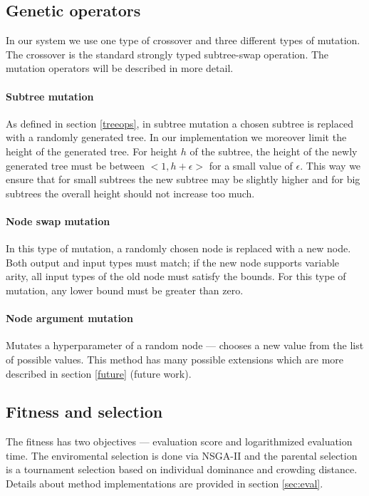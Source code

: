 \subsection{Genetic operators}
In our system we use one type of crossover and three different types of
mutation. The crossover is the standard strongly typed subtree-swap operation.
The mutation operators will be described in more detail.

\paragraph{Subtree mutation}
As defined in section \ref{treeops}, in subtree mutation a chosen subtree is
replaced with a randomly generated tree. In our implementation we moreover
limit the height of the generated tree. For height $h$ of the subtree, the
height of the newly generated tree must be between $<1, h + \epsilon>$ for a
small value of $\epsilon$. This way we ensure that for small subtrees the new
subtree may be slightly higher and for big subtrees the overall height should
not increase too much.

\paragraph{Node swap mutation}
In this type of mutation, a randomly chosen node is replaced with a new node.
Both output and input types must match; if the new node supports variable
arity, all input types of the old node must satisfy the bounds. For this type
of mutation, any lower bound must be greater than zero.

\paragraph{Node argument mutation}
Mutates a hyperparameter of a random node --- chooses a new value from the list
of possible values. This method has many possible extensions which are more
described in section \ref{future} (future work).

\subsection{Fitness and selection}

The fitness has two objectives --- evaluation score and logarithmized
evaluation time. The enviromental selection is done via NSGA-II and the 
parental selection is a tournament selection based on individual dominance and 
crowding distance. Details about method implementations are provided in 
section \ref{sec:eval}.

